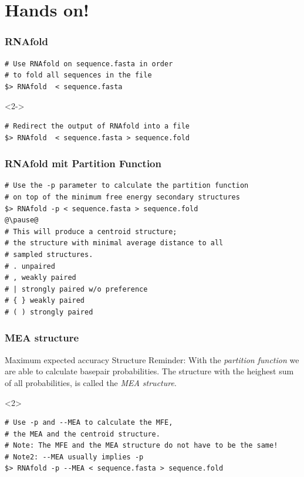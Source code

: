 \section[RNAfold]{Hands on!}

\begin{frame}[c, fragile]\frametitle{RNAfold}
  \begin{overlayarea}{\textwidth}{0.5\textheight}
  \begin{lstlisting}
# Use RNAfold on sequence.fasta in order 
# to fold all sequences in the file
$> RNAfold  < sequence.fasta
  \end{lstlisting}    

  \begin{onlyenv}<2->%
  \begin{lstlisting}
# Redirect the output of RNAfold into a file
$> RNAfold  < sequence.fasta > sequence.fold
  \end{lstlisting}            
  \end{onlyenv}
  \end{overlayarea}
\end{frame}

\begin{frame}[c, fragile]\frametitle{RNAfold mit Partition Function}
  \begin{lstlisting}
# Use the -p parameter to calculate the partition function
# on top of the minimum free energy secondary structures
$> RNAfold -p < sequence.fasta > sequence.fold  
@\pause@
# This will produce a centroid structure; 
# the structure with minimal average distance to all 
# sampled structures.
# . unpaired
# , weakly paired
# | strongly paired w/o preference
# { } weakly paired
# ( ) strongly paired
  \end{lstlisting}
\end{frame}

\begin{frame}[t, fragile]\frametitle{MEA structure}
  \begin{block}{Maximum expected accuracy Structure}
      Reminder: With the \emph{partition function} we are able to calculate basepair probabilities.
      The structure with the heighest sum of all probabilities, is called the \emph{MEA structure}.
  \end{block}

  \begin{onlyenv}<2>
   \hfill
  \begin{lstlisting}
# Use -p and --MEA to calculate the MFE,
# the MEA and the centroid structure.
# Note: The MFE and the MEA structure do not have to be the same!
# Note2: --MEA usually implies -p
$> RNAfold -p --MEA < sequence.fasta > sequence.fold
  \end{lstlisting}
\end{onlyenv}
\end{frame}

